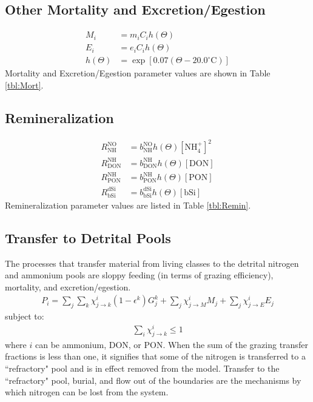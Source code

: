 \documentclass[draft,jgrga]{agutexSI2019}
\begin{document}
\begin{article}
\subsection*{Other Mortality and Excretion/Egestion}

\begin{align}
  M_i & = m_i C_i h(\Theta) \label{eq:M} \\
  E_i & = e_i C_i h(\Theta) \label{eq:E}\\
  h(\Theta) & = \exp\left[ 0.07 (\Theta-20.0^{\circ}\textrm{C}) \right] \label{eq:h}
\end{align}
Mortality and Excretion/Egestion parameter values are shown in Table \ref{tbl:Mort}.

\subsection*{Remineralization}

\begin{align}
R_{\textrm{NH}}^{\textrm{NO}} &= b_{\textrm{NH}}^{\textrm{NO}} h(\Theta)  \mathrm{[NH_4^+]}^2 \label{eq:R_NHNO} \\
R_{\textrm{DON}}^{\textrm{NH}} &= b_{\textrm{DON}}^{\textrm{NH}} h(\Theta) \mathrm{[DON]}  \label{eq:R_DONNH} \\
R_{\textrm{PON}}^{\textrm{NH}} &= b_{\textrm{PON}}^{\textrm{NH}} h(\Theta) \mathrm{[PON]} \label{eq:R_PONNH} \\
R_{\textrm{bSi}}^{\textrm{dSi}} &= b_{\textrm{bSi}}^{\textrm{dSi}} h(\Theta) \mathrm{[bSi]} \label{eq:R_bSiSi}
\end{align}
Remineralization parameter values are listed in Table \ref{tbl:Remin}.

\subsection*{Transfer to Detrital Pools}
The processes that transfer material from living classes to the detrital nitrogen and ammonium pools are sloppy feeding (in terms of grazing efficiency), mortality, and excretion/egestion. 
\begin{align}
\label{eq:P}
   P_i = \sum_j\sum_k\chi_{j\rightarrow k}^i(1-\epsilon^k)G_j^k + \sum_j\chi_{j\rightarrow M}^i M_j +\sum_j\chi_{j\rightarrow E}^i E_j
\end{align}
subject to:
\begin{align}
   \sum_i \chi_{j\rightarrow k}^i \le 1
\end{align}
where $i$ can be ammonium, DON, or PON.
When the sum of the grazing transfer fractions is less than one, it signifies that some of the nitrogen is transferred to a ``refractory" pool and is in effect removed from the model. 
Transfer to the ``refractory" pool, burial, and flow out of the boundaries are the mechanisms by which nitrogen can be lost from the system. 


\end{article}
\end{document}
